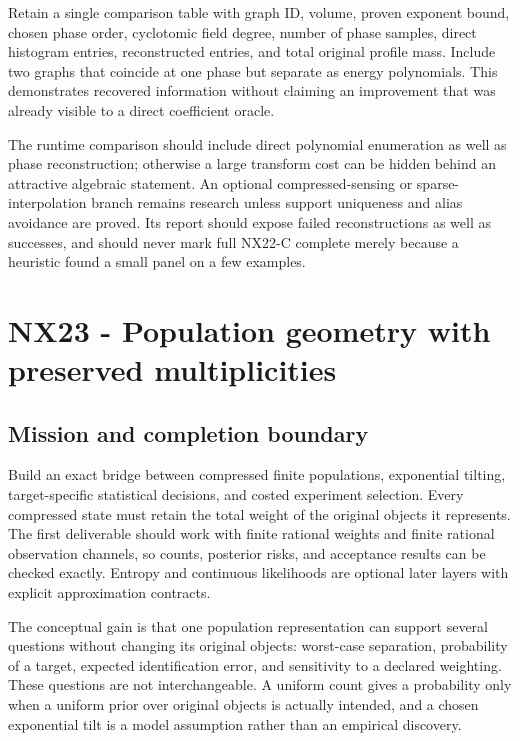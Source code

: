 \documentclass[
  11pt,
  a4paper,
]{report}
\begin{document}
Retain a single comparison table with graph ID, volume, proven exponent
bound, chosen phase order, cyclotomic field degree, number of phase
samples, direct histogram entries, reconstructed entries, and total
original profile mass. Include two graphs that coincide at one phase but
separate as energy polynomials. This demonstrates recovered information
without claiming an improvement that was already visible to a direct
coefficient oracle.

The runtime comparison should include direct polynomial enumeration as
well as phase reconstruction; otherwise a large transform cost can be
hidden behind an attractive algebraic statement. An optional
compressed-sensing or sparse-interpolation branch remains research
unless support uniqueness and alias avoidance are proved. Its report
should expose failed reconstructions as well as successes, and should
never mark full NX22-C complete merely because a heuristic found a small
panel on a few examples.

\hypertarget{nx23---population-geometry-with-preserved-multiplicities}{%
\chapter{NX23 - Population geometry with preserved
multiplicities}\label{nx23---population-geometry-with-preserved-multiplicities}}

\hypertarget{mission-and-completion-boundary-2}{%
\section{Mission and completion
boundary}\label{mission-and-completion-boundary-2}}

Build an exact bridge between compressed finite populations, exponential
tilting, target-specific statistical decisions, and costed experiment
selection. Every compressed state must retain the total weight of the
original objects it represents. The first deliverable should work with
finite rational weights and finite rational observation channels, so
counts, posterior risks, and acceptance results can be checked exactly.
Entropy and continuous likelihoods are optional later layers with
explicit approximation contracts.

The conceptual gain is that one population representation can support
several questions without changing its original objects: worst-case
separation, probability of a target, expected identification error, and
sensitivity to a declared weighting. These questions are not
interchangeable. A uniform count gives a probability only when a uniform
prior over original objects is actually intended, and a chosen
exponential tilt is a model assumption rather than an empirical
discovery.
\end{document}
